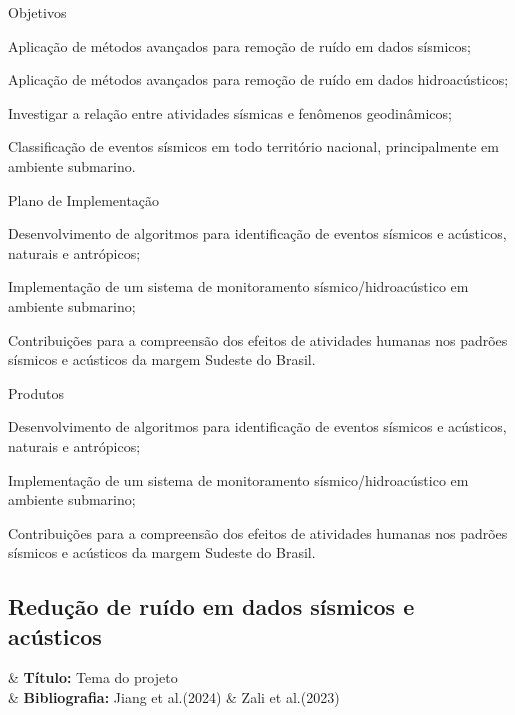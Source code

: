 \documentclass[10pt,a4paper,oneside]{book}
\begin{document}
\begin{fancyenum}{\faFutbol}{Objetivos}
  \item Aplicação de métodos avançados para remoção de ruído em dados sísmicos;
  \item Aplicação de métodos avançados para remoção de ruído em dados hidroacústicos;
  \item Investigar a relação entre atividades sísmicas e fenômenos geodinâmicos;
  \item Classificação de eventos sísmicos em todo território nacional, principalmente em ambiente submarino.
\end{fancyenum}

\begin{fancyenum}{\faBrain}{Plano de Implementação}
  \item Desenvolvimento de algoritmos para identificação de eventos sísmicos e acústicos, naturais e antrópicos;
  \item Implementação de um sistema de monitoramento sísmico/hidroacústico em ambiente submarino;
  \item Contribuições para a compreensão dos efeitos de atividades humanas nos padrões sísmicos e acústicos da margem Sudeste do Brasil.
\end{fancyenum}

\begin{fancyenum}{\faShoppingCart}{Produtos}
  \item Desenvolvimento de algoritmos para identificação de eventos sísmicos e acústicos, naturais e antrópicos;
  \item Implementação de um sistema de monitoramento sísmico/hidroacústico em ambiente submarino;
  \item Contribuições para a compreensão dos efeitos de atividades humanas nos padrões sísmicos e acústicos da margem Sudeste do Brasil.
\end{fancyenum}

\subsection{Redução de ruído em dados sísmicos e acústicos}

\bigskip

\begin{projectbox}[frametitle=\faProjectDiagram{}\quad Panorama do Projeto de pesquisa: Redução de ruído]
	\begin{datelist}
		\faTag & \textbf{Título:} Tema do projeto \\
		\faBook & \textbf{Bibliografia:}  Jiang et al.(2024) \& Zali et al.(2023)\\
	\end{datelist}
\end{projectbox}
\end{document}
